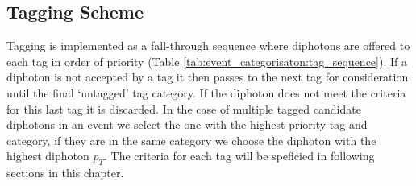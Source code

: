 \subsection{Tagging Scheme}
Tagging is implemented as a fall-through sequence where diphotons are offered to each tag in order of priority (Table \ref{tab:event_categorisaton:tag_sequence}). 
If a diphoton is not accepted by a tag it then passes to the next tag for consideration until the final `untagged' tag category. 
If the diphoton does not meet the criteria for this last tag it is discarded.
In the case of multiple tagged candidate diphotons in an event we select the one with the highest priority tag and category, if they are in the same category we choose the diphoton with the highest diphoton $p_{T}$.
The criteria for each tag will be speficied in following sections in this chapter.
\begin{table}[h!]
    \centering
    \caption{The \Hgg tag sequence in order of tag priority from highest (top) to lowest (bottom).}
    \label{tab:event_categorisaton:tag_sequence}
\end{table}







